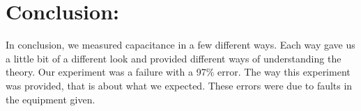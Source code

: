 \documentclass{article}
\begin{document}


\singlespace
\newpage

\section*{Conclusion:}
In conclusion, we measured capacitance  in a few different ways.  Each way gave us a little bit of a different look and provided different ways of understanding the theory.  Our experiment was a failure with a 97\% error.  The way this experiment was provided, that is about what we expected.  These errors were due to faults in the equipment given.
\end{document}
